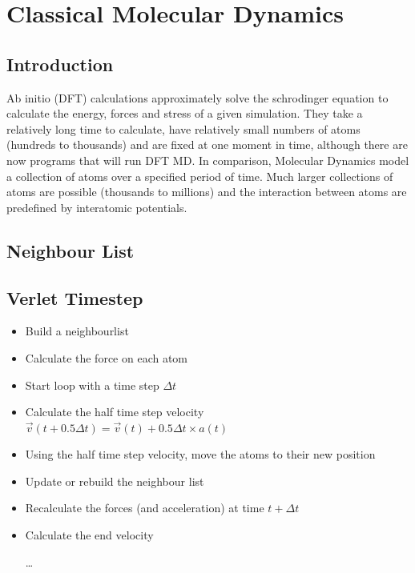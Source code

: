 \section{Classical Molecular Dynamics}

\subsection{Introduction}

Ab initio (DFT) calculations approximately solve the schrodinger equation to calculate the energy, forces and stress of a given simulation.  They take a relatively long time to calculate, have relatively small numbers of atoms (hundreds to thousands) and are fixed at one moment in time, although there are now programs that will run DFT MD.  In comparison, Molecular Dynamics model a collection of atoms over a specified period of time.  Much larger collections of atoms are possible (thousands to millions) and the interaction between atoms are predefined by interatomic potentials.




\subsection{Neighbour List}





\subsection{Verlet Timestep}


\begin{itemize}
\item Build a neighbourlist
\item Calculate the force on each atom
\item Start loop with a time step $\Delta t$
\item Calculate the half time step velocity $\vec{v}(t+0.5 \Delta t) = \vec{v}(t) + 0.5 \Delta t \times a (t)$
\item Using the half time step velocity, move the atoms to their new position
\item Update or rebuild the neighbour list
\item Recalculate the forces (and acceleration) at time $t+\Delta t$
\item Calculate the end velocity

\ldots 
\end{itemize}



